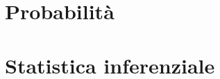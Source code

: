 \documentclass[12pt,openany]{amsbook}
\theoremstyle{plain}
\numberwithin{equation}{section} %
\theoremstyle{definition}
\theoremstyle{remark}
\begin{document}
    

    \tableofcontents

    \part{Probabilità}
    
    
    
    
    \part{Statistica inferenziale}
    
    
\end{document}
